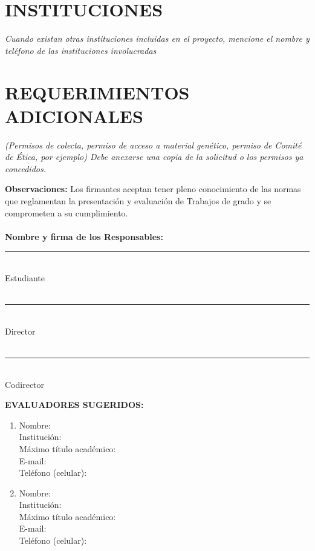 \documentclass[12pt,letterpaper]{article}
\begin{document}
\section{INSTITUCIONES}
\emph{ Cuando existan otras instituciones incluidas en el proyecto, mencione el nombre y teléfono de las instituciones involucradas}

\section{REQUERIMIENTOS ADICIONALES}
\emph{(Permisos de colecta, permiso de acceso a material genético, permiso de Comité de Ética, por ejemplo) Debe anexarse una copia de la solicitud o los permisos ya concedidos.}

\newpage

\textbf{Observaciones:} Los firmantes aceptan tener pleno conocimiento de las normas que reglamentan la presentación y evaluación de Trabajos de grado y se comprometen a su cumplimiento.\\
\\
\textbf{Nombre y firma de los Responsables:}
\vspace{1 cm}\\
\noindent\rule{5cm}{0.4pt}\\
Estudiante\\
\vspace{2 pt}\\
\noindent\rule{5cm}{0.4pt}\\
Director\\
\vspace{2 pt}\\
\noindent\rule{5cm}{0.4pt}\\
Codirector\\

\begin{framed}
\textbf{EVALUADORES SUGERIDOS:}
\begin{enumerate}
\item Nombre:\\ 
Institución:\\
Máximo título académico:\\ 
E-mail:\\
Teléfono (celular):\\

\item Nombre:\\
Institución:\\
Máximo título académico:\\
E-mail:\\
Teléfono (celular):\\
\end{enumerate}
\end{framed}
\end{document}
